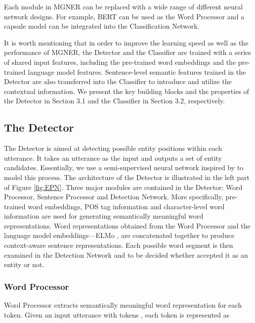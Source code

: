 \documentclass[11pt,a4paper]{article}
\newcommand{\ModelName}{\textsc{MGNER}}
\begin{document}
Each module in {\ModelName} can be replaced with a wide range of different neural network designs. For example, BERT \cite{devlin2018bert} can be used as the Word Processor and a capsule model \cite{sabour2017dynamic, xia2018zero} can be integrated into the Classification Network. 

It is worth mentioning that in order to improve the learning speed as well as the performance of {\ModelName}, the Detector and the Classifier are trained with a series of shared input features, including the pre-trained word embeddings and the pre-trained language model features.
Sentence-level semantic features trained in the Detector are also transferred into the Classifier to introduce and utilize the contextual information.
We present the key building blocks and the properties of the Detector in Section 3.1 and the Classifier in Section 3.2, respectively.

\subsection{The Detector}
The Detector is aimed at detecting possible entity positions within each utterance. It takes an utterance as the input and outputs a set of entity candidates.
Essentially, we use a semi-supervised neural network inspired by \cite{peters2017semi} to model this process. The architecture of the Detector is illustrated in the left part of Figure \ref{fig:EPN}. Three major modules are contained in the Detector: Word Processor, Sentence Processor and Detection Network. More specifically, pre-trained word embeddings, POS tag information and character-level word information are used for generating semantically meaningful word representations. Word representations obtained from the Word Processor and the language model embeddings---ELMo \cite{peters2018deep}, are concatenated together to produce context-aware sentence representations. Each possible word segment is then examined in the Detection Network and to be decided whether accepted it as an entity or not. 

\subsubsection{Word Processor}
Word Processor extracts semantically meaningful word representation for each token.
Given an input utterance with  tokens , each token  is represented as
\vspace{-1.5em}
\end{document}
